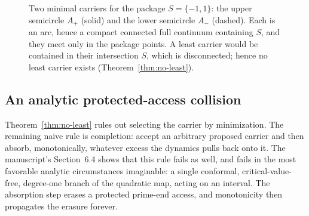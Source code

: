\begin{figure}[ht]
\centering
{}
\caption{Two minimal carriers for the package $S=\{-1,1\}$: the upper
semicircle $A_+$ (solid) and the lower semicircle $A_-$ (dashed). Each is an
arc, hence a compact connected full continuum containing $S$, and they meet
only in the package points. A least carrier would be contained in their
intersection $S$, which is disconnected; hence no least carrier exists
(Theorem~\ref{thm:no-least}).}
\label{fig:no-least}
\end{figure}

\subsection{An analytic protected-access collision}\label{subsec:B-collision}

Theorem~\ref{thm:no-least} rules out selecting the carrier by minimization.
The remaining naive rule is completion: accept an arbitrary proposed carrier
and then absorb, monotonically, whatever excess the dynamics pulls back onto
it. The manuscript's Section~6.4 shows that this rule fails as well, and
fails in the most favorable analytic circumstances imaginable: a single
conformal, critical-value-free, degree-one branch of the quadratic map,
acting on an interval. The absorption step erases a protected prime-end
access, and monotonicity then propagates the erasure forever.

